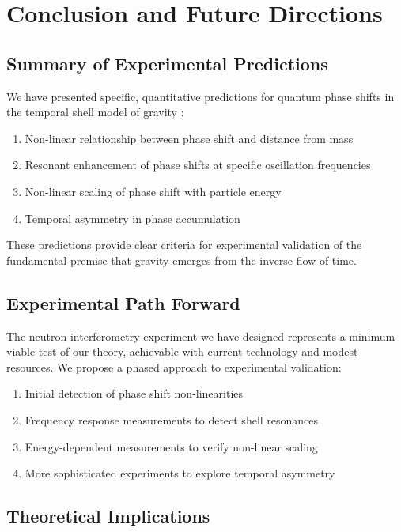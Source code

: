\documentclass[12pt,a4paper]{article}
\begin{document}
\section{Conclusion and Future Directions}

\subsection{Summary of Experimental Predictions}

We have presented specific, quantitative predictions for quantum phase shifts in the temporal shell model of gravity \citep{cow, neutron}:

\begin{enumerate}
    \item Non-linear relationship between phase shift and distance from mass
    \item Resonant enhancement of phase shifts at specific oscillation frequencies
    \item Non-linear scaling of phase shift with particle energy
    \item Temporal asymmetry in phase accumulation
\end{enumerate}

These predictions provide clear criteria for experimental validation of the fundamental premise that gravity emerges from the inverse flow of time.

\subsection{Experimental Path Forward}

The neutron interferometry experiment we have designed represents a minimum viable test of our theory, achievable with current technology and modest resources. We propose a phased approach to experimental validation:

\begin{enumerate}
    \item Initial detection of phase shift non-linearities
    \item Frequency response measurements to detect shell resonances
    \item Energy-dependent measurements to verify non-linear scaling
    \item More sophisticated experiments to explore temporal asymmetry
\end{enumerate}

\subsection{Theoretical Implications}
\end{document}
